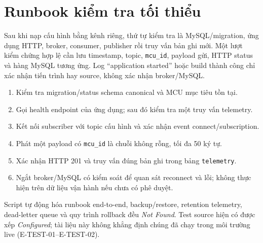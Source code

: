 \section{Runbook kiểm tra tối thiểu}

Sau khi nạp cấu hình bằng kênh riêng, thứ tự kiểm tra là MySQL/migration, ứng dụng
HTTP, broker, consumer, publisher rồi truy vấn bản ghi mới. Một lượt kiểm chứng hợp lệ
cần lưu timestamp, topic, \texttt{mcu\_id}, payload gửi, HTTP status và hàng MySQL
tương ứng. Log ``application started'' hoặc build thành công chỉ xác nhận tiến trình hay
source, không xác nhận broker/MySQL.

\begin{enumerate}
  \item Kiểm tra migration/status schema canonical và MCU mục tiêu tồn tại.
  \item Gọi health endpoint của ứng dụng; sau đó kiểm tra một truy vấn telemetry.
  \item Kết nối subscriber với topic cấu hình và xác nhận event connect/subscription.
  \item Phát một payload có \texttt{mcu\_id} là chuỗi không rỗng, tối đa 50 ký tự.
  \item Xác nhận HTTP 201 và truy vấn đúng bản ghi trong bảng \texttt{telemetry}.
  \item Ngắt broker/MySQL có kiểm soát để quan sát reconnect và lỗi; không thực hiện
  trên dữ liệu vận hành nếu chưa có phê duyệt.
\end{enumerate}

Script tự động hóa runbook end-to-end, backup/restore, retention telemetry, dead-letter
queue và quy trình rollback đều \textit{Not Found}. Test source hiện có được xếp
\textit{Configured}; tài liệu này không khẳng định chúng đã chạy trong môi trường live
(E-TEST-01--E-TEST-02).
